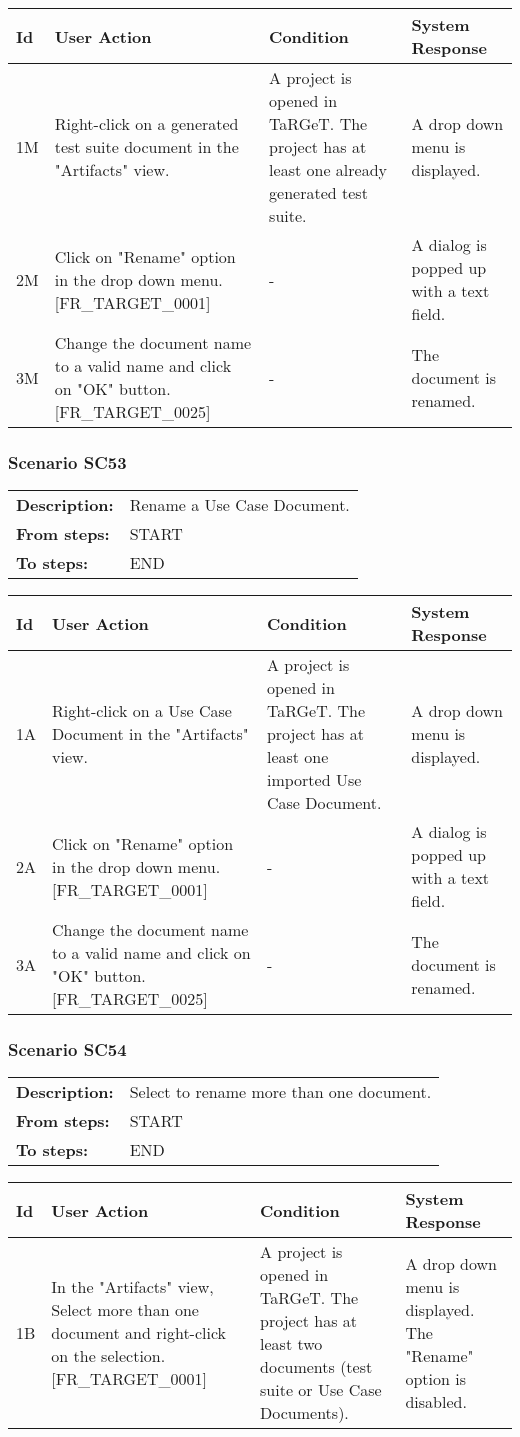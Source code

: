 \documentclass[a4paper,11pt]{article}
\newcommand{\bl}{\\ \hline}
\begin{document}
\begin{tabular}{|p{0.8in}|p{1.6in}|p{1.6in}|p{1.6in}|}
\hline
Id & User Action & Condition & System Response  \bl 
1M & Right-click on a generated test suite document in the
						"Artifacts" view.  & A project is opened in TaRGeT. The project has at least
						one already generated test suite. & A drop down menu is displayed. \bl 
2M & Click on "Rename" option in the drop down menu.
						[FR_TARGET_0001] & - & A dialog is popped up with a text field. \bl 
3M & Change the document name to a valid name and click on "OK"
						button. [FR_TARGET_0025] & - & The document is renamed. \bl 
\end{tabular}
\subsubsection*{Scenario SC53}
\begin{tabular}{p{1in}p{4in}}
{\bf Description:} & Rename a Use Case Document. \\
{\bf From steps:} & START \\
{\bf To steps:} & END \\
\end{tabular}
 
\begin{tabular}{|p{0.8in}|p{1.6in}|p{1.6in}|p{1.6in}|}
\hline
Id & User Action & Condition & System Response  \bl 
1A & Right-click on a Use Case Document in the "Artifacts" view.
					 & A project is opened in TaRGeT. The project has at least
						one imported Use Case Document. & A drop down menu is displayed. \bl 
2A & Click on "Rename" option in the drop down menu.
						[FR_TARGET_0001] & - & A dialog is popped up with a text field. \bl 
3A & Change the document name to a valid name and click on "OK"
						button. [FR_TARGET_0025] & - & The document is renamed. \bl 
\end{tabular}
\subsubsection*{Scenario SC54}
\begin{tabular}{p{1in}p{4in}}
{\bf Description:} & Select to rename more than one document. \\
{\bf From steps:} & START \\
{\bf To steps:} & END \\
\end{tabular}
 
\begin{tabular}{|p{0.8in}|p{1.6in}|p{1.6in}|p{1.6in}|}
\hline
Id & User Action & Condition & System Response  \bl 
1B & In the "Artifacts" view, Select more than one document and
						right-click on the selection. [FR_TARGET_0001] & A project is opened in TaRGeT. The project has at least
						two documents (test suite or Use Case Documents). & A drop down menu is displayed. The "Rename" option is
						disabled. \bl 
\end{tabular}
\end{document}
